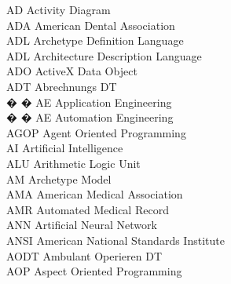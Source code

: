 \begin{tabbing}
    \>AD \>\>Activity Diagram\\

    \>ADA \>\>American Dental Association\\

    \>ADL \>\>Archetype Definition Language\\

    \>ADL \>\>Architecture Description Language\\

    \>ADO \>\>ActiveX Data Object\\


    \>ADT \>\>Abrechnungs DT\\

� � \>AE \>\>Application Engineering\\

� � \>AE \>\>Automation Engineering\\

    \>AGOP \>\>Agent Oriented Programming\\

    \>AI \>\>Artificial Intelligence\\



    \>ALU \>\>Arithmetic Logic Unit\\


    \>AM \>\>Archetype Model\\

    \>AMA \>\>American Medical Association\\

    \>AMR \>\>Automated Medical Record\\

    \>ANN \>\>Artificial Neural Network\\

    \>ANSI \>\>American National Standards Institute\\

    \>AODT \>\>Ambulant Operieren DT\\

    \>AOP \>\>Aspect Oriented Programming\\


\end{tabbing}

